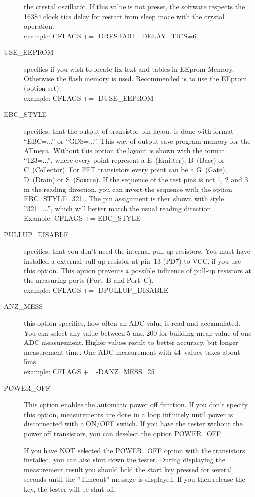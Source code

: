 \begin{description}
the crystal oszillator.
If this value is not preset, the software respects the 16384 clock tics delay for restart from sleep mode with the crystal operation.\\
example: CFLAGS += -DRESTART\_DELAY\_TICS=6
  \item[USE\_EEPROM] specifies if you wish to locate fix text and tables in EEprom Memory. Otherwise the flash memory is used.
Recommended is to use the EEprom (option set).\\
example: CFLAGS += -DUSE\_EEPROM
\item[EBC\_STYLE] specifies, that the output of transistor pin layout is done with format ``EBC=...'' or ``GDS=...''.
This way of output save program memory for the ATmega. Without this option the layout is shown with the
format ``123=...'', where every point represent a E~(Emitter), B~(Base) or C~(Collector).
For FET transistors every point can be a G~(Gate), D~(Drain) or S~(Source).
If the sequence of the test pins is not 1, 2 and 3 in the reading direction, you can invert the sequence with the option
EBC\_STYLE=321 . The pin assignment is then shown with style ''321=...'', which will better match the usual
reading direction.\\
Example: CFLAGS += EBC\_STYLE
\item[PULLUP\_DISABLE] specifies, that you don't need the internal pull-up resistors.
 You must have installed a external pull-up resistor at pin~13 (PD7) to VCC, if you use this option.
This option prevents a possible influence of pull-up resistors at the measuring ports (Port~B and Port~C).\\
example: CFLAGS += -DPULLUP\_DISABLE
  \item[ANZ\_MESS] this option specifies, how often an ADC value is read and accumulated.
You can select any value between 5 and 200 for building mean value of one ADC measurement.
Higher values result to better accuracy, but  longer measurement time.
One ADC measurement with 44~values takes about 5ms.\\
example: CFLAGS += -DANZ\_MESS=25
  \item[POWER\_OFF] This option enables the automatic power off function. If you don't specify this option,
 measurements are done in a loop infinitely  until power is disconnected with a ON/OFF switch.
If you have the tester without the power off transistors, you can deselect the option POWER\_OFF.

If you have NOT selected the POWER\_OFF option with the transistors installed,
you can also shut down the tester.
During displaying the measurement result you should hold the start key pressed for several seconds until
the ''Timeout'' message is displayed.  If you then release the key, the tester will be shut off.


\end{description}
